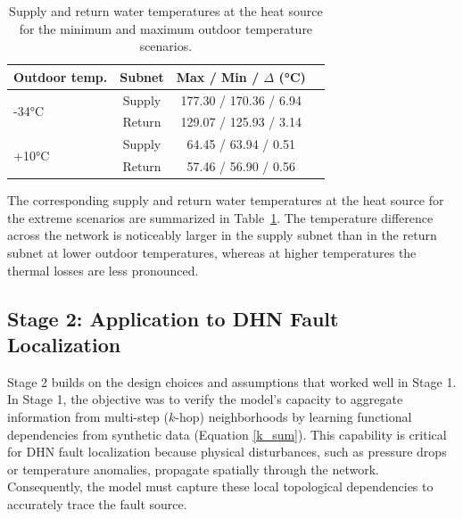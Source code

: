 \documentclass[energies,article,submit,pdftex,moreauthors]{Definitions/mdpi}
\newif\ifshowrevisions
\newcommand{\revisionstyle}[1]{\textcolor{blue}{#1}}
\newcommand{\revision}[1]{\ifshowrevisions\revisionstyle{#1}\else#1\fi}
\begin{document}
\begin{table}[H]
\centering
\begin{tabularx}{0.8\textwidth}{lccc}
\toprule
\textbf{Outdoor temp.} & \textbf{Subnet} & \textbf{Max / Min / $\Delta$ (°C)} \\
\midrule
\multirow{2}{*}{-34°C} & Supply & 177.30 / 170.36 / 6.94 \\
                       & Return & 129.07 / 125.93 / 3.14 \\
\midrule
\multirow{2}{*}{+10°C} & Supply & 64.45 / 63.94 / 0.51 \\
                       & Return & 57.46 / 56.90 / 0.56 \\
\bottomrule
\end{tabularx}
\caption{Supply and return water temperatures at the heat source for the minimum and maximum outdoor temperature scenarios.}\label{tab:temperatures}
\end{table}

\revision{
The corresponding supply and return water temperatures at the heat source for the extreme scenarios are summarized in Table~\ref{tab:temperatures}. The temperature difference across the network is noticeably larger in the supply subnet than in the return subnet at lower outdoor temperatures, whereas at higher temperatures the thermal losses are less pronounced.
}

\subsection{Stage 2: Application to DHN Fault Localization}\label{stage2}


Stage 2 builds on the design choices and assumptions that worked well in Stage
1. In Stage 1, the objective was to verify the model's capacity to aggregate
information from multi-step ($k$-hop) neighborhoods by learning functional
dependencies from synthetic data (Equation \ref{k_sum}). This capability is
critical for DHN fault localization because physical disturbances, such as
pressure drops or temperature anomalies, propagate spatially through the
network. Consequently, the model must capture these local topological
dependencies to accurately trace the fault source.
\end{document}
